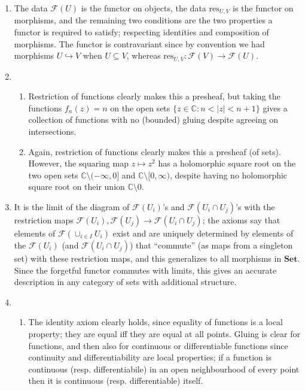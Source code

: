 \documentclass{report}
\newcommand{\cat}[1]{\mathbf{#1}} %
\newcommand{\res}{{\mathrm{res}}} %
\newcommand{\scrF}{\mathscr{F}}
\newcommand{\C}{\mathbb{C}}
\begin{document}
\begin{enumerate}[label=\textbf{2.2.\Alph*.}]
	\item The data $\scrF(U)$ is the functor on objects, the data $\res_{U,V}$ is
	      the functor on morphisms, and the remaining two conditions are the two
	      properties a functor is required to satisfy; respecting identities and
	      composition of morphisms. The functor is contravariant since by
	      convention we had morphisms $U\hookrightarrow V$ when $U\subseteq V$,
	      whereas $\res_{U,V}:\scrF(V)\to\scrF(U)$.
	\item
	      \begin{enumerate}[label=(\alph*)]
		      \item Restriction of functions clearly makes this a presheaf, but
		            taking the functions $f_n(z)=n$ on the open sets
		            $\{z\in\C:n<|z|<n+1\}$ gives a collection of functions with no
		            (bounded) gluing despite agreeing on intersections.

		      \item Again, restriction of functions clearly makes this a presheaf
		            (of sets). However, the squaring map $z\mapsto z^2$ has a
		            holomorphic square root on the two open sets
		            $\C\setminus(-\infty,0]$ and $\C\setminus[0,\infty)$, despite
		            having no holomorphic square root on their union $\C\setminus0$.
	      \end{enumerate}

	\item It is the limit of the diagram of $\scrF(U_i)$'s and $\scrF(U_i\cap U_j)$'s
	      with the restriction maps $\scrF(U_i),\scrF(U_j)\to\scrF(U_i\cap U_j)$; the
	      axioms say that elements of $\scrF(\cup_{i\in I}U_i)$ exist and are
	      uniquely determined by elements of the $\scrF(U_i)$ (and $\scrF(U_i\cap U_j)$)
	      that ``commute'' (as maps from a singleton set) with these restriction
	      maps, and this generalizes to all morphisms in $\cat{Set}$. Since the
	      forgetful functor commutes with limits, this gives an accurate
	      description in any category of sets with additional structure.

	\item
	      \begin{enumerate}[label=(\alph*)]
		      \item The identity axiom clearly holds, since equality of functions
		            is a local property; they are equal iff they are equal at all
		            points. Gluing is clear for functions, and then also for
		            continuous or differentiable functions since continuity and
		            differentiability are local properties; if a function is
		            continuous (resp. differentiabile) in an open neighbourhood of
		            every point then it is continuous (resp. differentiable) itself.


\end{enumerate}
\end{enumerate}
\end{document}

